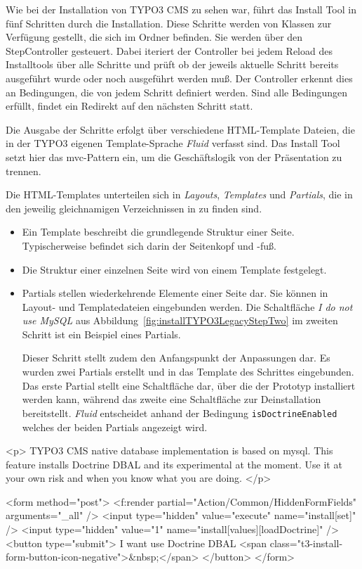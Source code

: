 Wie bei der Installation von TYPO3 CMS zu sehen war, führt das Install Tool in fünf Schritten durch die Installation. Diese Schritte werden von Klassen zur Verfügung gestellt, die sich im Ordner  befinden. Sie werden über den StepController  gesteuert. Dabei iteriert der Controller bei jedem Reload des Installtools über alle Schritte und prüft ob der jeweils aktuelle Schritt bereits ausgeführt wurde oder noch ausgeführt werden muß. Der Controller erkennt dies an Bedingungen, die von jedem Schritt definiert werden.
Sind alle Bedingungen erfüllt, findet ein Redirekt auf den nächsten Schritt statt.

Die Ausgabe der Schritte erfolgt über verschiedene HTML-Template Dateien, die in der TYPO3 eigenen Template-Sprache \textit{Fluid} verfasst sind. Das Install Tool setzt hier das \gls{mvc}-Pattern ein, um die Geschäftslogik von der Präsentation zu trennen.

Die HTML-Templates unterteilen sich in \textit{Layouts}, \textit{Templates} und \textit{Partials}, die in den jeweilig gleichnamigen Verzeichnissen in  zu finden sind.

\begin{itemize}
	\item Ein Template beschreibt die grundlegende Struktur einer Seite. Typischerweise befindet sich darin der Seitenkopf und -fuß.
	\item Die Struktur einer einzelnen Seite wird von einem Template festgelegt.
	\item  Partials stellen wiederkehrende Elemente einer Seite dar. Sie können in Layout- und Templatedateien eingebunden werden. Die Schaltfläche \textit{I do not use MySQL} aus Abbildung~\ref{fig:installTYPO3LegacyStepTwo} im zweiten Schritt ist ein Beispiel eines Partials.

Dieser Schritt stellt zudem den Anfangspunkt der Anpassungen dar. Es wurden zwei Partials erstellt und in das Template des Schrittes eingebunden. Das erste Partial stellt eine Schaltfläche dar, über die der Prototyp installiert werden kann, während das zweite eine Schaltfläche zur Deinstallation bereitstellt. \textit{Fluid} entscheidet anhand der Bedingung \texttt{isDoctrineEnabled} welches der beiden Partials angezeigt wird.
\end{itemize}

\begin{htmlcode}
<p>
TYPO3 CMS native database implementation is based on mysql. This feature
installs Doctrine DBAL and its experimental at the moment.
Use it at your own risk and when you know what you are doing.
</p>

<form method="post">
	<f:render partial="Action/Common/HiddenFormFields" arguments="{_all}" />
	<input type="hidden" value="execute" name="install[set]" />
	<input type="hidden" value="1" name="install[values][loadDoctrine]" />
	<button type="submit">
		I want use Doctrine DBAL
		<span class="t3-install-form-button-icon-negative">&nbsp;</span>
	</button>
</form>
\end{htmlcode}

